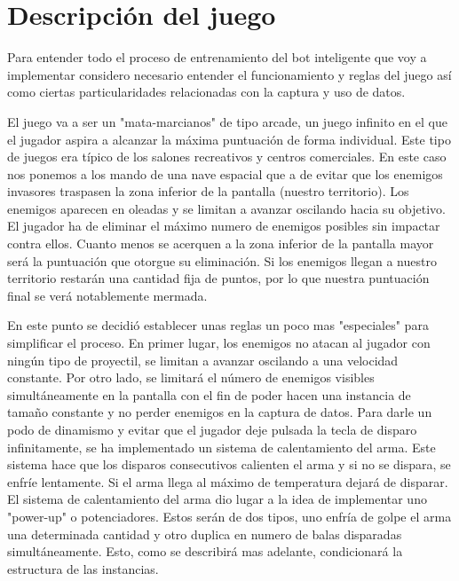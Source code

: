 

\section{Descripción del juego}

Para entender todo el proceso de entrenamiento del bot inteligente que voy a implementar considero necesario entender el funcionamiento y reglas del juego así como ciertas particularidades relacionadas con la captura y uso de datos.

El juego va a ser un "mata-marcianos" de tipo arcade, un juego infinito en el que el jugador aspira a alcanzar la máxima puntuación de forma individual. Este tipo de juegos era típico de los salones recreativos y centros comerciales. En este caso nos ponemos a los mando de una nave espacial que a de evitar que los enemigos invasores traspasen la zona inferior de la pantalla (nuestro territorio). Los enemigos aparecen en oleadas y se limitan a avanzar oscilando hacia su objetivo. El jugador ha de eliminar el máximo numero de enemigos posibles sin impactar contra ellos. Cuanto menos se acerquen a la zona inferior de la pantalla mayor será la puntuación que otorgue su eliminación. Si los enemigos llegan a nuestro territorio restarán una cantidad fija de puntos, por lo que nuestra puntuación final se verá notablemente mermada.

En este punto se decidió establecer unas reglas un poco mas "especiales" para simplificar el proceso. En primer lugar, los enemigos no atacan al jugador con ningún tipo de proyectil, se limitan a avanzar oscilando a una velocidad constante. Por otro lado, se limitará el número de enemigos visibles simultáneamente en la pantalla con el fin de poder hacen una instancia de tamaño constante y no perder enemigos en la captura de datos. Para darle un podo de dinamismo y evitar que el jugador deje pulsada la tecla de disparo infinitamente, se ha implementado un sistema de calentamiento del arma. Este sistema hace que los disparos consecutivos calienten el arma y si no se dispara, se enfríe lentamente. Si el arma llega al máximo de temperatura dejará de disparar. El sistema de calentamiento del arma dio lugar a la idea de implementar uno "power-up" o potenciadores. Estos serán de dos tipos, uno enfría de golpe el arma una determinada cantidad y otro duplica en numero de balas disparadas simultáneamente. Esto, como se describirá mas adelante, condicionará la estructura de las instancias.

